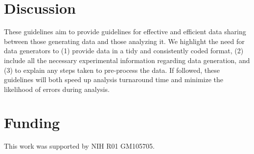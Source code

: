 \documentclass[12pt]{article}
\begin{document}
\section{Discussion}\label{discussion}

These guidelines aim to provide guidelines for effective and efficient
data sharing between those generating data and those analyzing it. We
highlight the need for data generators to (1) provide data in a tidy and
consistently coded format, (2) include all the necessary experimental
information regarding data generation, and (3) to explain any steps
taken to pre-process the data. If followed, these guidelines will both
speed up analysis turnaround time and minimize the likelihood of errors
during analysis.

\section{Funding}\label{funding}

This work was supported by NIH R01 GM105705.



\end{document}
